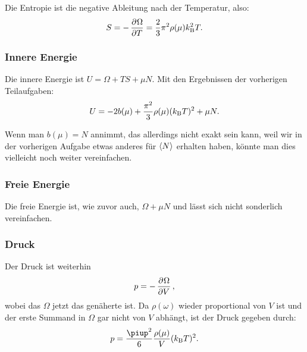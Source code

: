 Die Entropie ist die negative Ableitung nach der Temperatur, also:
\[
    S = - \dpd \Omega T = \frac 23 \pi^2 \rho(\mu) \kB^2 T.
\]

\subsubsection{Innere Energie}

Die innere Energie ist $U = \Omega + TS + \mu N$. Mit den Ergebnissen der
vorherigen Teilaufgaben:
\[
    U = - 2 b(\mu) + \frac{\pi^2}3 \rho(\mu) (k_\text B T)^2 + \mu N.
\]

Wenn man $b(\mu) = N$ annimmt, das allerdings nicht exakt sein kann, weil wir
in der vorherigen Aufgabe etwas anderes für $\langle N \rangle$ erhalten haben,
könnte man dies vielleicht noch weiter vereinfachen.

\subsubsection{Freie Energie}

Die freie Energie ist, wie zuvor auch, $\Omega + \mu N$ und lässt sich nicht
sonderlich vereinfachen.

\subsubsection{Druck}

Der Druck ist weiterhin
\[
    p = - \dpd \Omega V,
\]
wobei das $\Omega$ jetzt das genäherte ist. Da $\rho(\omega)$ wieder
proportional von $V$ ist und der erste Summand in $\Omega$ gar nicht von $V$
abhängt, ist der Druck gegeben durch:
\[
    p = \frac{\piup^2}6 \frac{\rho(\mu)}V (\kB T)^2.
\]

\IfFileExists{\bibliographyfile}{
    \printbibliography
}{}



